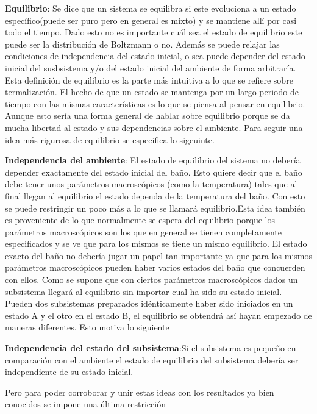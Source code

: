 \textbf{Equilibrio}: Se dice que un sistema se equilibra si este evoluciona a un estado específico(puede ser puro pero en general es mixto) y se mantiene allí por casi todo el tiempo. Dado esto no es importante cuál sea el estado de equilibrio este puede ser la distribución de Boltzmann o no. Además se puede relajar las condiciones de independencia del estado inicial, o sea puede depender del estado inicial del susbsistema y/o del estado inicial del ambiente de forma arbitraría. Esta definición de equilibrio es la parte más intuitiva a lo que se refiere sobre termalización. El hecho de que un estado se mantenga por un largo periodo de tiempo con las mismas características es lo que se piensa al  pensar en equilibrio. Aunque esto sería una forma general de hablar sobre equilibrio porque se da mucha libertad al estado y sus dependencias sobre el ambiente. Para seguir una idea más rigurosa de equilibrio se especifica lo sigeuinte.

\textbf{Independencia del ambiente}: El  estado de equilibrio del sistema no debería depender exactamente del estado inicial del baño. Esto quiere decir que el baño debe tener unos parámetros macroscópicos (como la temperatura) tales que al final llegan al equilibrio el estado dependa de la temperatura del baño. Con esto se puede restringir un poco más a lo que se llamará equilibrio.Esta idea también es proveniente de lo que normalmente se espera del equilibrio porque los parámetros macroscópicos son los que en general se tienen completamente especificados y se ve que para los mismos se tiene un mismo equilibrio. El estado exacto del baño no debería jugar un papel  tan importante ya que para los mismos parámetros macroscópicos pueden haber varios estados del baño que concuerden con ellos. Como se supone que con ciertos parámetros macroscópicos dados  un subsistema llegará al equilibrio sin importar cual ha sido su estado inicial. Pueden dos subsistemas preparados idénticamente haber sido iniciados en un estado A y el otro en el estado B, el equilibrio se obtendrá así hayan empezado de maneras diferentes. Esto motiva lo siguiente

\textbf{Independencia del estado del subsistema}:Si el subsistema es pequeño en comparación con el ambiente el estado de equilibrio del subsistema debería ser independiente de su estado inicial.

Pero para poder corroborar y unir estas ideas con los resultados ya bien conocidos se impone una última restricción

